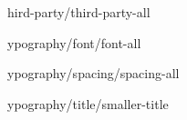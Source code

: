 
\def\loadOption #1{}

\loadOption third-party/third-party-all

\loadOption typography/font/font-all

\loadOption typography/spacing/spacing-all

\loadOption typography/title/smaller-title
